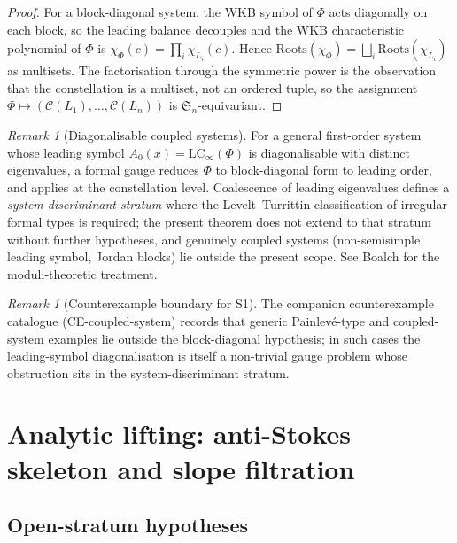 \documentclass[11pt,a4paper]{article}
\theoremstyle{plain}
\theoremstyle{definition}
\theoremstyle{remark}
\newtheorem{remark}[theorem]{Remark}
\newcommand{\LCinf}{\mathrm{LC}_\infty}
\newcommand{\Roots}{\mathrm{Roots}}
\newcommand{\Cl}{\mathcal{C}}
\newcommand{\Symm}{\mathfrak{S}}
\begin{document}
\begin{proof}
For a block-diagonal system, the WKB symbol of $\Phi$ acts diagonally on
each block, so the leading balance decouples and the WKB characteristic
polynomial of $\Phi$ is $\chi_\Phi(c) = \prod_i \chi_{L_i}(c)$. Hence
$\Roots(\chi_\Phi) = \bigsqcup_i \Roots(\chi_{L_i})$ as multisets. The
factorisation through the symmetric power is the observation that the
constellation is a multiset, not an ordered tuple, so the assignment
$\Phi \mapsto (\Cl(L_1), \dots, \Cl(L_n))$ is $\Symm_n$-equivariant.
\end{proof}

\begin{remark}[Diagonalisable coupled systems]\label{rem:S1-diag}
For a general first-order system whose leading symbol $A_0(x) =
\LCinf(\Phi)$ is diagonalisable with distinct eigenvalues, a formal gauge
reduces $\Phi$ to block-diagonal form to leading order, and
 applies at the constellation level. Coalescence of leading
eigenvalues defines a \emph{system discriminant stratum} where the
Levelt--Turrittin classification of irregular formal types is required;
the present theorem does not extend to that stratum without further
hypotheses, and genuinely coupled systems (non-semisimple leading symbol,
Jordan blocks) lie outside the present scope. See Boalch
\cite{boalch-stokes,boalch-wildhodge} for the moduli-theoretic treatment.
\end{remark}

\begin{remark}[Counterexample boundary for S1]\label{rem:S1-counter}
The companion counterexample catalogue (CE-coupled-system) records that
generic Painlev{\'e}-type and coupled-system examples lie outside the
block-diagonal hypothesis; in such cases the leading-symbol diagonalisation
is itself a non-trivial gauge problem whose obstruction sits in the
system-discriminant stratum.
\end{remark}


\section{Analytic lifting: anti-Stokes skeleton and slope filtration}\label{sec:analytic}

\subsection{Open-stratum hypotheses}\label{ssec:OS}
\end{document}
